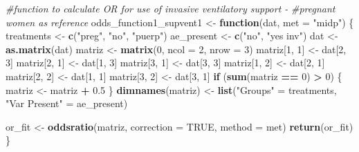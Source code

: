 \documentclass[
]{article}
\newenvironment{Shaded}{\begin{snugshade}}{\end{snugshade}}
\newcommand{\CommentTok}[1]{\textcolor[rgb]{0.56,0.35,0.01}{\textit{#1}}}
\newcommand{\ControlFlowTok}[1]{\textcolor[rgb]{0.13,0.29,0.53}{\textbf{#1}}}
\newcommand{\DataTypeTok}[1]{\textcolor[rgb]{0.13,0.29,0.53}{#1}}
\newcommand{\DecValTok}[1]{\textcolor[rgb]{0.00,0.00,0.81}{#1}}
\newcommand{\FloatTok}[1]{\textcolor[rgb]{0.00,0.00,0.81}{#1}}
\newcommand{\KeywordTok}[1]{\textcolor[rgb]{0.13,0.29,0.53}{\textbf{#1}}}
\newcommand{\NormalTok}[1]{#1}
\newcommand{\OperatorTok}[1]{\textcolor[rgb]{0.81,0.36,0.00}{\textbf{#1}}}
\newcommand{\OtherTok}[1]{\textcolor[rgb]{0.56,0.35,0.01}{#1}}
\newcommand{\StringTok}[1]{\textcolor[rgb]{0.31,0.60,0.02}{#1}}
\begin{document}
\begin{Shaded}
\begin{Highlighting}[]
\CommentTok{#function to calculate OR for use of invasive ventilatory support -}
\CommentTok{#pregnant women as reference}
\NormalTok{odds_function1_supvent1 <-}\StringTok{ }\ControlFlowTok{function}\NormalTok{(dat, }\DataTypeTok{met =} \StringTok{"midp"}\NormalTok{) \{}
\NormalTok{  treatments <-}\StringTok{ }\KeywordTok{c}\NormalTok{(}\StringTok{"preg"}\NormalTok{, }\StringTok{"no"}\NormalTok{, }\StringTok{"puerp"}\NormalTok{)}
\NormalTok{  ae_present <-}\StringTok{ }\KeywordTok{c}\NormalTok{(}\StringTok{"no"}\NormalTok{, }\StringTok{"yes inv"}\NormalTok{)}
\NormalTok{  dat <-}\StringTok{ }\KeywordTok{as.matrix}\NormalTok{(dat)}
\NormalTok{  matriz <-}\StringTok{ }\KeywordTok{matrix}\NormalTok{(}\DecValTok{0}\NormalTok{, }\DataTypeTok{ncol =} \DecValTok{2}\NormalTok{, }\DataTypeTok{nrow =} \DecValTok{3}\NormalTok{)}
\NormalTok{  matriz[}\DecValTok{1}\NormalTok{, }\DecValTok{1}\NormalTok{] <-}\StringTok{ }\NormalTok{dat[}\DecValTok{2}\NormalTok{, }\DecValTok{3}\NormalTok{]}
\NormalTok{  matriz[}\DecValTok{2}\NormalTok{, }\DecValTok{1}\NormalTok{] <-}\StringTok{ }\NormalTok{dat[}\DecValTok{1}\NormalTok{, }\DecValTok{3}\NormalTok{]}
\NormalTok{  matriz[}\DecValTok{3}\NormalTok{, }\DecValTok{1}\NormalTok{] <-}\StringTok{ }\NormalTok{dat[}\DecValTok{3}\NormalTok{, }\DecValTok{3}\NormalTok{]}
\NormalTok{  matriz[}\DecValTok{1}\NormalTok{, }\DecValTok{2}\NormalTok{] <-}\StringTok{ }\NormalTok{dat[}\DecValTok{2}\NormalTok{, }\DecValTok{1}\NormalTok{]}
\NormalTok{  matriz[}\DecValTok{2}\NormalTok{, }\DecValTok{2}\NormalTok{] <-}\StringTok{ }\NormalTok{dat[}\DecValTok{1}\NormalTok{, }\DecValTok{1}\NormalTok{]}
\NormalTok{  matriz[}\DecValTok{3}\NormalTok{, }\DecValTok{2}\NormalTok{] <-}\StringTok{ }\NormalTok{dat[}\DecValTok{3}\NormalTok{, }\DecValTok{1}\NormalTok{]}
  \ControlFlowTok{if}\NormalTok{ (}\KeywordTok{sum}\NormalTok{(matriz }\OperatorTok{==}\StringTok{ }\DecValTok{0}\NormalTok{) }\OperatorTok{>}\StringTok{ }\DecValTok{0}\NormalTok{) \{}
\NormalTok{    matriz <-}\StringTok{ }\NormalTok{matriz }\OperatorTok{+}\StringTok{ }\FloatTok{0.5}
\NormalTok{  \}}
  \KeywordTok{dimnames}\NormalTok{(matriz) <-}\StringTok{ }\KeywordTok{list}\NormalTok{(}\StringTok{"Groups"}\NormalTok{ =}\StringTok{ }\NormalTok{treatments,}
                           \StringTok{"Var Present"}\NormalTok{ =}\StringTok{ }\NormalTok{ae_present)}
  
\NormalTok{  or_fit <-}\StringTok{ }\KeywordTok{oddsratio}\NormalTok{(matriz, }\DataTypeTok{correction =} \OtherTok{TRUE}\NormalTok{, }\DataTypeTok{method =}\NormalTok{ met)}
  \KeywordTok{return}\NormalTok{(or_fit)}
\NormalTok{\}}


\end{Highlighting}
\end{Shaded}
\end{document}
